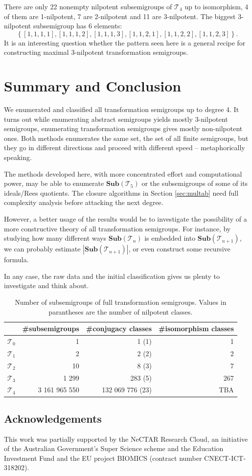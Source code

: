 \documentclass{amsart}
\newcommand{\cT}{{\mathcal T}}
\newcommand{\Sub}{\mathbf{Sub}}
\theoremstyle{plain}
\theoremstyle{definition}
\begin{document}
There are only 22 nonempty nilpotent subsemigroups of $\cT_4$ up to isomorphism, 4 of them are 1-nilpotent, 7 are 2-nilpotent and 11 are 3-nilpotent.
The biggest 3-nilpotent subsemigroup has 6 elements:
$$\left\{[1,1,1,1],[1,1,1,2],[1,1,1,3],[1,1,2,1],[1,1,2,2],[1,1,2,3]\right\}.$$
It is an interesting question whether the pattern seen here is a general recipe for constructing maximal 3-nilpotent transformation semigroups.
\section{Summary and Conclusion}
We enumerated and classified all transformation semigroups up to degree 4.
It turns out while enumerating abstract semigroups yields mostly 3-nilpotent semigroups, enumerating transformation semigroups gives mostly non-nilpotent ones.
Both methods enumerates the same set, the set of all finite semigroups, but they go in different directions and proceed with different speed -- metaphorically speaking. 

The methods developed here, with more concentrated effort and computational power,  may be able to enumerate $\Sub(\cT_5)$ or the subsemigroups of some of its ideals/Rees quotients. 
The closure algorithms in Section \ref{sec:multab} need full complexity analysis before attacking the next degree. 

However, a better usage of the results would be to investigate the possibility of a more constructive theory of all transformation semigroups.
For instance, by studying how many different ways $\Sub(\cT_n)$ is embedded into $\Sub(\cT_{n+1})$, we can probably estimate $|\Sub(\cT_{n+1})|$, or even construct some recursive formula.

In any case, the raw data and the initial classification gives us plenty to investigate and think about.
\begin{table}
\renewcommand{\arraystretch}{1}
\begin{tabular}{|c|r|r|r|}
\hline
 & \#subsemigroups & \#conjugacy classes & \#isomorphism classes \\
\hline
$\cT_0$ & 1  & 1 (1)& 1\\
\hline
$\cT_1$ & 2  & 2 (2)& 2\\
\hline
$\cT_2$ & 10  & 8 (3)& 7\\
\hline
$\cT_3$ & 1 299 & 283 (5)& 267\\
\hline
$\cT_4$ & 3 161 965 550 & 132 069 776 (23)& TBA\\
\hline
\end{tabular}
\caption{Number of subsemigroups of full transformation semigroups. Values in parantheses are the number of nilpotent classes.}
\end{table}

\subsection*{Acknowledgements}
This work was partially supported by the NeCTAR Research Cloud, an
initiative of the Australian Government's Super Science scheme and the
Education Investment Fund and the EU project BIOMICS (contract number CNECT-ICT-318202).



\end{document}
